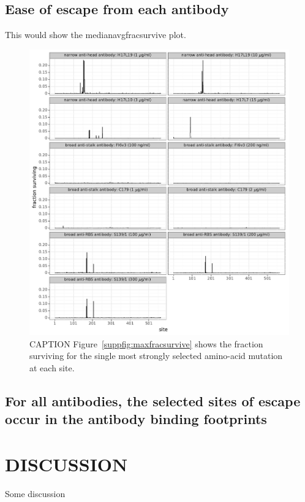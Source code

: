 \documentclass[11pt]{article}
\begin{document}
\subsection*{Ease of escape from each antibody}
This would show the medianavgfracsurvive plot.

\begin{figure}
\centerline{\includegraphics[width=\textwidth]{figs/avgfracsurvive.pdf}}
\caption{
\label{fig:avgfracsurvive}
CAPTION
Figure~\ref{suppfig:maxfracsurvive} shows the fraction surviving for the single most strongly selected amino-acid mutation at each site.
}
\end{figure}

\subsection*{For all antibodies, the selected sites of escape occur in the antibody binding footprints}

\section*{DISCUSSION}
Some discussion

\clearpage
\end{document}
